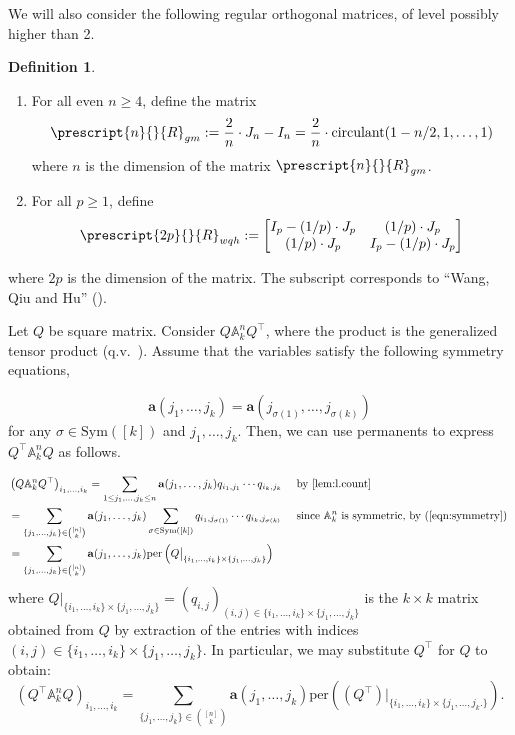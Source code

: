 \documentclass[12pt]{article}
\numberwithin{equation}{section}
\theoremstyle{definition}
\newtheorem{definition}{Definition}
\newcommand{\ev}[1]{( #1 )}
\newcommand{\ew}[1]{\left( #1 \right)}
\begin{document}
We will also consider the following regular orthogonal matrices, of level possibly higher than 2.
\begin{definition}
\label{def:gm_and_wqh_matrices}
\begin{enumerate}
\item For all even $n\geq 4$, define the matrix
$$
\prescript{n}{}{R}_{gm} := \dfrac{2}{n} \cdot J_n - I_n = \frac{2}{n} \cdot \textup{circulant}( 1 - n/2 , 1, \ldots, 1)
$$
where $n$ is the dimension of the matrix $\prescript{n}{}{R}_{gm}$.

\item For all $p\geq 1$, define 
$$
\prescript{2p}{}{R}_{wqh} := \begin{bmatrix} 
I_p - (1/p) \cdot J_p & (1/p) \cdot J_p \\ 
(1/p) \cdot J_p & I_p - (1/p) \cdot J_p
\end{bmatrix}
$$
\end{enumerate}
where $2p$ is the dimension of the matrix. The subscript corresponds to ``Wang, Qiu and Hu'' (\cite{wang_qui_hu_2019}). 
\end{definition}

Let $Q$ be square matrix. Consider $Q \mathbb{A}^n_k Q^\top$, where the product is the generalized tensor product (q.v.~). Assume that the variables satisfy the following symmetry equations, 

\begin{equation}
\label{eqn:symmetry}
\mathbf{a}\ev{j_1,\ldots,j_k} = \mathbf{a}\ev{j_{\sigma\ev{1}},\ldots,j_{\sigma\ev{k}}}
\end{equation}
for any $\sigma\in \mathrm{Sym}\ev{[k]}$ and $j_1,\ldots,j_k$. Then, we can use permanents to express $Q^\top \mathbb{A}^n_k Q$ as follows. 

\begin{align*}
& \ew{  Q \mathbb{A}^n_k Q^\top  }_{i_1,\ldots,i_k} = \sum_{1\leq j_1, \ldots ,j_k \leq n} \mathbf{a}\ev{j_1,\ldots,j_k} q_{i_1,j_1} \cdots q_{i_k,j_k} && \text{ by \Cref{lem:l.count}} \\ 
& = \sum_{ \{ j_1,\ldots,j_k\} \in \binom{ [n] }{k} } \mathbf{a}\ev{j_1,\ldots,j_k} \sum_{ \sigma \in \mathrm{Sym}\ev{[k]} }   q_{ i_1, j_{\sigma\ev{1}} }  \cdots  q_{ i_k,j_{\sigma\ev{k}} } &&\text{ since $\mathbb{A}^n_k$ is symmetric, by (\ref{eqn:symmetry}) } \\ 
& = \sum_{ \{ j_1,\ldots,j_k\} \in \binom{ [n] }{k} } \mathbf{a}\ev{j_1,\ldots,j_k} \mathrm{per}\ew{ Q\big\vert_{ \{ i_1,\ldots,i_k\} \times \{ j_1,\ldots,j_k \} } } 
\end{align*}
where 
$Q\big\vert_{ \{ i_1,\ldots,i_k\} \times \{ j_1,\ldots,j_k \} }  = \ev{ q_{i,j}}_{\ev{ i,j } \in \{ i_1,\ldots,i_k\} \times \{ j_1,\ldots,j_k \} } $ is the $k \times k $ matrix obtained from $Q$ by extraction of the entries with indices $\ev{ i,j } \in \{ i_1,\ldots,i_k\} \times \{ j_1,\ldots,j_k \}$. In particular, we may substitute $Q^\top$ for $Q$ to obtain:
$$
\ew{  Q^\top \mathbb{A}^n_k Q  }_{i_1,\ldots,i_k} = \sum_{ \{ j_1,\ldots,j_k\} \in \binom{ [n] }{k} } \mathbf{a}\ev{j_1,\ldots,j_k} \mathrm{per}\ew{ (Q^{\top})\big\vert_{ \{ i_1,\ldots,i_k\} \times \{ j_1,\ldots,j_k. \} } }. 
$$
\end{document}
